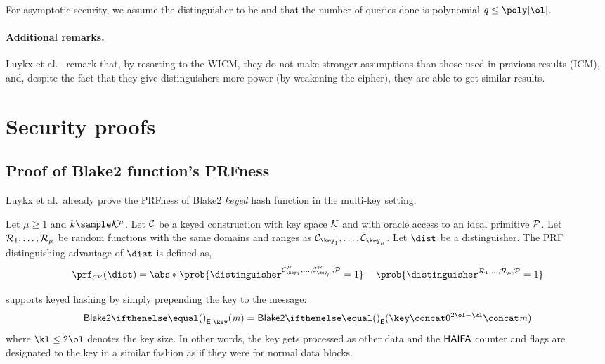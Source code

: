 For asymptotic security, we assume the distinguisher to be \ppt{} and that the number of queries done is polynomial $q\leq \poly[\ol]$.

\paragraph{Additional remarks.}

Luykx et al.~\cite{luykx2016security} remark that, by resorting to the WICM, they do not make stronger assumptions than those used in previous results (ICM), and, despite the fact that they give distinguishers more power (by weakening the cipher), they are able to get similar results.

\section{Security proofs}\label{appendix:blake:proofs}

\subsection{Proof of Blake2 function's PRFness}\label{appendix:blake:proofs:prf}

Luykx et al.~already prove the PRFness of Blake2 \textit{keyed} hash function in the multi-key setting.

\begin{definition}
	Let $\mu \geq 1$ and $k \sample \keyspace^\mu$. Let $\mathcal{C}$ be a keyed construction with key space $\mathcal{K}$ and with oracle access to an ideal primitive $\mathcal{P}$. Let $\mathcal{R}_1, \ldots, \mathcal{R}_\mu$ be random functions with the same domains and ranges as $\primC_{\key_1}, \ldots, \primC_{\key_\mu}$. Let $\dist$ be a distinguisher. The PRF distinguishing advantage of $\dist$ is defined as,
\[
    \prf_{\primC^\primP}(\dist) = \abs*{\prob{\distinguisher^{\primC^\primP_{\key_1}, \ldots, \primC^\primP_{\key_\mu}, \primP} = 1} - \prob{\distinguisher^{\primR_1, \ldots, \primR_\mu, \primP} = 1}}
\]
\end{definition}

 supports keyed hashing by simply prepending the key to the message:
\[
    \blake{2}{}_{\Enc,\key}(\msg) = \blake{2}{}_{\Enc}(\key \concat 0^{2\ol - \kl} \concat \msg)
\]
where $\kl \leq 2\ol$ denotes the key size. In other words, the key gets processed as other data and the $\mathsf{HAIFA}$ counter and flags are designated to the key in a similar fashion as if they were for normal data blocks.

